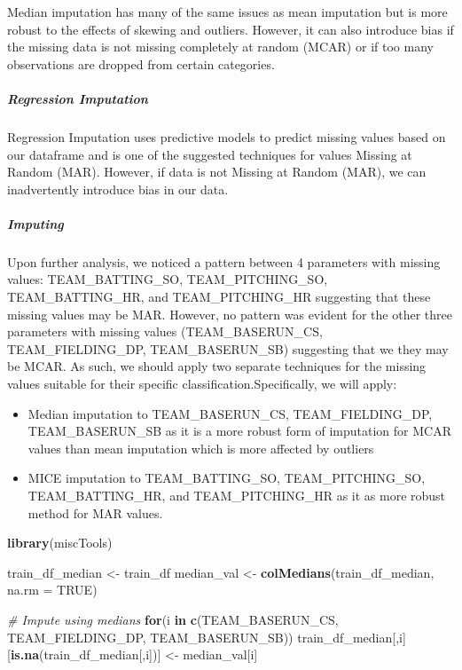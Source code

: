 \documentclass[
]{article}
\newenvironment{Shaded}{\begin{snugshade}}{\end{snugshade}}
\newcommand{\AttributeTok}[1]{\textcolor[rgb]{0.13,0.29,0.53}{#1}}
\newcommand{\CommentTok}[1]{\textcolor[rgb]{0.56,0.35,0.01}{\textit{#1}}}
\newcommand{\ConstantTok}[1]{\textcolor[rgb]{0.56,0.35,0.01}{#1}}
\newcommand{\ControlFlowTok}[1]{\textcolor[rgb]{0.13,0.29,0.53}{\textbf{#1}}}
\newcommand{\FunctionTok}[1]{\textcolor[rgb]{0.13,0.29,0.53}{\textbf{#1}}}
\newcommand{\NormalTok}[1]{#1}
\newcommand{\OtherTok}[1]{\textcolor[rgb]{0.56,0.35,0.01}{#1}}
\newcommand{\StringTok}[1]{\textcolor[rgb]{0.31,0.60,0.02}{#1}}
\providecommand{\tightlist}{%
  \setlength{\itemsep}{0pt}\setlength{\parskip}{0pt}}
\begin{document}
Median imputation has many of the same issues as mean imputation but is
more robust to the effects of skewing and outliers. However, it can also
introduce bias if the missing data is not missing completely at random
(MCAR) or if too many observations are dropped from certain categories.

\subparagraph{Regression Imputation}\label{regression-imputation}

Regression Imputation uses predictive models to predict missing values
based on our dataframe and is one of the suggested techniques for values
Missing at Random (MAR). However, if data is not Missing at Random
(MAR), we can inadvertently introduce bias in our data.

\subparagraph{Imputing}\label{imputing}

Upon further analysis, we noticed a pattern between 4 parameters with
missing values: TEAM\_BATTING\_SO, TEAM\_PITCHING\_SO,
TEAM\_BATTING\_HR, and TEAM\_PITCHING\_HR suggesting that these missing
values may be MAR. However, no pattern was evident for the other three
parameters with missing values (TEAM\_BASERUN\_CS, TEAM\_FIELDING\_DP,
TEAM\_BASERUN\_SB) suggesting that we they may be MCAR. As such, we
should apply two separate techniques for the missing values suitable for
their specific classification.Specifically, we will apply:

\begin{itemize}
\tightlist
\item
  Median imputation to TEAM\_BASERUN\_CS, TEAM\_FIELDING\_DP,
  TEAM\_BASERUN\_SB as it is a more robust form of imputation for MCAR
  values than mean imputation which is more affected by outliers
\item
  MICE imputation to TEAM\_BATTING\_SO, TEAM\_PITCHING\_SO,
  TEAM\_BATTING\_HR, and TEAM\_PITCHING\_HR as it as more robust method
  for MAR values.
\end{itemize}

\begin{Shaded}
\begin{Highlighting}[]
\FunctionTok{library}\NormalTok{(miscTools)}

\NormalTok{train\_df\_median }\OtherTok{\textless{}{-}}\NormalTok{ train\_df}
\NormalTok{median\_val }\OtherTok{\textless{}{-}} \FunctionTok{colMedians}\NormalTok{(train\_df\_median, }\AttributeTok{na.rm =} \ConstantTok{TRUE}\NormalTok{)}

\CommentTok{\# Impute using medians}
\ControlFlowTok{for}\NormalTok{(i }\ControlFlowTok{in} \FunctionTok{c}\NormalTok{(}\StringTok{\textquotesingle{}TEAM\_BASERUN\_CS\textquotesingle{}}\NormalTok{,   }\StringTok{\textquotesingle{}TEAM\_FIELDING\_DP\textquotesingle{}}\NormalTok{, }\StringTok{\textquotesingle{}TEAM\_BASERUN\_SB\textquotesingle{}}\NormalTok{))}
\NormalTok{    train\_df\_median[,i][}\FunctionTok{is.na}\NormalTok{(train\_df\_median[,i])] }\OtherTok{\textless{}{-}}\NormalTok{ median\_val[i]}
\end{Highlighting}
\end{Shaded}
\end{document}

